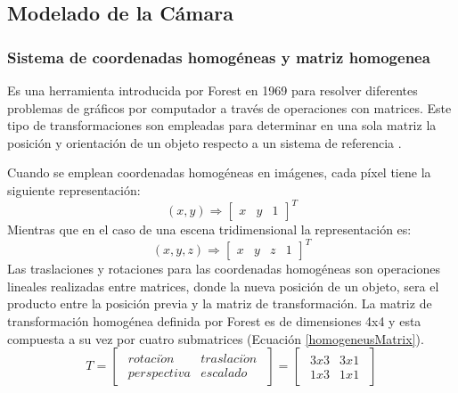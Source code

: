 \subsection{Modelado de la Cámara}
\subsubsection{Sistema de coordenadas homogéneas y matriz homogenea}
Es una herramienta introducida por Forest en 1969 para resolver diferentes problemas de gráficos por computador a través de operaciones con matrices. Este tipo de transformaciones son empleadas para determinar en una sola matriz la posición y orientación de un objeto respecto a un sistema de referencia \cite{RSSFernando_homogeneusC}.

Cuando se emplean coordenadas homogéneas en imágenes, cada píxel tiene la siguiente representación:
\begin{equation}
(x, y) \Rightarrow
\begin{bmatrix}
x & y & 1
\end{bmatrix}^{T}
\end{equation}
Mientras que en el caso de una escena tridimensional la representación es:
\begin{equation}
(x, y, z) \Rightarrow
\begin{bmatrix}
x & y & z & 1
\end{bmatrix}^{T}
\end{equation}
Las traslaciones y rotaciones para las coordenadas homogéneas son operaciones lineales realizadas entre matrices, donde la nueva posición de un objeto, sera el producto entre la posición previa y la matriz de transformación. La matriz de transformación homogénea definida por Forest es de dimensiones 4x4 y esta compuesta a su vez por cuatro submatrices (Ecuación \ref{homogeneusMatrix}).
\begin{equation}
    T = \begin{bmatrix}
        \begin{array}{c|c}
                rotaci\acute{o}n & traslaci\acute{o}n\\
                \hline
                perspectiva & escalado
        \end{array}
        \end{bmatrix}
        =
        \begin{bmatrix}
        \begin{array}{c|c}
                3 x 3 & 3 x 1\\
                \hline
                1 x 3 & 1 x 1
        \end{array}
        \end{bmatrix}
\label{homogeneusMatrix}
\end{equation}
